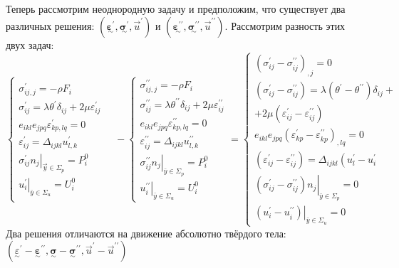 Теперь рассмотрим неоднородную задачу и предположим, что существует два различных решения: $\left(\underset{\sim}{\boldsymbol{\varepsilon}^{\prime}}, \underset{\sim}{\boldsymbol{\sigma}^{\prime}}, \vec{u}^{\prime}\right)$ и $\left(\underset{\sim}{\boldsymbol{\varepsilon^{\prime\prime}}}, \underset{\sim}{\boldsymbol{\sigma}^{\prime \prime}}, \vec{u}^{\prime \prime}\right)$. Рассмотрим разность этих двух задач:
$$
\left\{\begin{array}{l}
\sigma_{i j, j}^{\prime}=-\rho F_i \\
\sigma_{i j}^{\prime}=\lambda \theta^{\prime} \delta_{i j}+2 \mu \varepsilon_{i j}^{\prime} \\
e_{i k l} e_{j p q} \varepsilon_{k p, l q}^{\prime}=0 \\
\varepsilon_{i j}^{\prime}=\Delta_{i j k l} u_{l, k}^{\prime} \\
\left.\sigma_{i j}^{\prime} n_j\right|_{\vec{y} \in \Sigma_p}=P_i^0 \\
\left.u_i^{\prime}\right|_{\bar{y} \in \Sigma_u}=U_i^0
\end{array} \quad-\left\{\begin{array}{l}
\sigma_{i j, j}^{\prime \prime}=-\rho F_i \\
\sigma_{i j}^{\prime \prime}=\lambda \theta^{\prime \prime} \delta_{i j}+2 \mu \varepsilon_{i j}^{\prime \prime} \\
e_{i k l} e_{j p q} \varepsilon_{k p, l q}^{\prime \prime}=0 \\
\varepsilon_{i j}^{\prime \prime}=\Delta_{i j k l} u_{l, k}^{\prime \prime} \\
\left.\sigma_{i j}^{\prime \prime} n_j\right|_{\bar{y} \in \Sigma_p}=P_i^0 \\
\left.u_i^{\prime \prime}\right|_{\bar{y} \in \Sigma_u}=U_i^0
\end{array}=\right.\right.
\left\{\begin{array}{l}
\left(\sigma_{i j}^{\prime}-\sigma_{i j}^{\prime \prime}\right)_{, j}=0 \\
\left(\sigma_{i j}^{\prime}-\sigma_{i j}^{\prime \prime}\right)=\lambda\left(\theta^{\prime}-\theta^{\prime \prime}\right) \delta_{i j}+\\
+2 \mu\left(\varepsilon_{i j}^{\prime}-\varepsilon_{i j}^{\prime \prime}\right)\\
e_{i k l} e_{j p q}\left(\varepsilon_{k p}^{\prime}-\varepsilon_{k p}^{\prime \prime}\right)_{, l q}=0 \\
\left(\varepsilon_{i j}^{\prime}-\varepsilon_{i j}^{\prime \prime}\right)=\Delta_{i j k l}\left(u_l^{\prime}-u_i^{\prime}\right. \\
\left.\left(\sigma_{i j}^{\prime}-\sigma_{i j}^{\prime \prime}\right) n_j\right|_{\bar{y} \in \Sigma_p}=0 \\
\left.\left(u_i^{\prime}-u_i^{\prime \prime}\right)\right|_{\bar{y} \in \Sigma_u}=0
\end{array}\right.
$$
Два решения отличаются на движение абсолютно твёрдого тела: $\left(\underset{\sim}\varepsilon^\prime-{\underset{\sim}{\boldsymbol{\varepsilon}}}^{\prime \prime}, \underset{\sim}{\boldsymbol{\sigma}}-{\underset{\sim}{\boldsymbol{\sigma}}}^{\prime \prime}, \vec{u}^{\prime}-\vec{u}^{\prime \prime}\right)$


